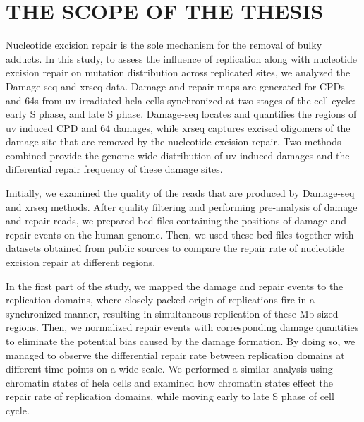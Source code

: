 \setlength{\parindent}{0pt}
\chapter{\bf THE SCOPE OF THE THESIS}

Nucleotide excision repair is the sole mechanism for the removal of bulky adducts. In this study, to assess the influence of replication along with nucleotide excision repair on mutation distribution across replicated sites, we analyzed the Damage-seq and \gls{xrseq} data. Damage and repair maps are generated for \gls{CPD}s and \gls{64}s from \gls{uv}-irradiated \gls{hela} cells synchronized at two stages of the cell cycle: early S phase, and late S phase. Damage-seq locates and quantifies the regions of \gls{uv} induced \gls{CPD} and \gls{64} damages, while \gls{xrseq} captures excised oligomers of the damage site that are removed by the nucleotide excision repair. Two methods combined provide the genome-wide distribution of \gls{uv}-induced damages and the differential repair frequency of these damage sites. 

Initially, we examined the quality of the reads that are produced by Damage-seq and \gls{xrseq} methods. After quality filtering and performing pre-analysis of damage and repair reads, we prepared bed files containing the positions of damage and repair events on the human genome. Then, we used these bed files together with datasets obtained from public sources to compare the repair rate of nucleotide excision repair at different regions.

In the first part of the study, we mapped the damage and repair events to the replication domains, where closely packed origin of replications fire in a synchronized manner, resulting in simultaneous replication of these Mb-sized regions. Then, we normalized repair events with corresponding damage quantities to eliminate the potential bias caused by the damage formation. By doing so, we managed to observe the differential repair rate between replication domains at different time points on a wide scale. We performed a similar analysis using chromatin states of \gls{hela} cells and examined how chromatin states effect the repair rate of replication domains, while moving early to late S phase of cell cycle.

